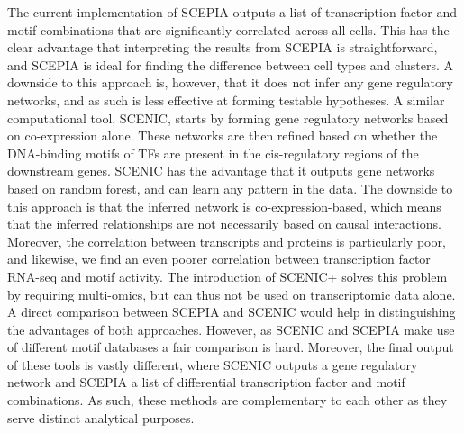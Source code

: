 The current implementation of SCEPIA outputs a list of transcription factor and motif combinations that are significantly correlated across all cells. This has the clear advantage that interpreting the results from SCEPIA is straightforward, and SCEPIA is ideal for finding the difference between cell types and clusters. A downside to this approach is, however, that it does not infer any gene regulatory networks, and as such is less effective at forming testable hypotheses. A similar computational tool, SCENIC\cite{Aibar_2017}, starts by forming gene regulatory networks based on co-expression alone. These networks are then refined based on whether the DNA-binding motifs of TFs are present in the cis-regulatory regions of the downstream genes. SCENIC has the advantage that it outputs gene networks based on random forest, and can learn any pattern in the data. The downside to this approach is that the inferred network is co-expression-based, which means that the inferred relationships are not necessarily based on causal interactions. Moreover, the correlation between transcripts and proteins is particularly poor\cite{Fortelny2017,Franks2017}, and likewise, we find an even poorer correlation between transcription factor RNA-seq and motif activity. The introduction of SCENIC+\cite{BravoGonzlezBlas2023} solves this problem by requiring multi-omics, but can thus not be used on transcriptomic data alone. A direct comparison between SCEPIA and SCENIC would help in distinguishing the advantages of both approaches. However, as SCENIC and SCEPIA make use of different motif databases a fair comparison is hard. Moreover, the final output of these tools is vastly different, where SCENIC outputs a gene regulatory network and SCEPIA a list of differential transcription factor and motif combinations. As such, these methods are complementary to each other as they serve distinct analytical purposes.

